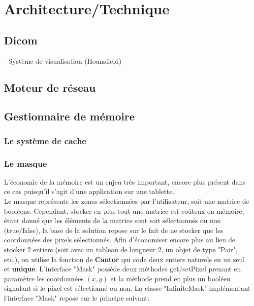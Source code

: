 \chapter{Architecture/Technique}


\section{Dicom}

- Système de visualisation (Hounsfield)

\section{Moteur de réseau}

\section{Gestionnaire de mémoire}
\subsection{Le système de cache}

\subsection{Le masque}
L'économie de la mémoire est un enjeu très important, encore plus présent dans ce cas
puisqu'il s'agit d'une application sur une tablette.\\
Le masque représente les zones sélectionnées
par l'utilisateur, soit une matrice de booléens. Cependant, stocker en plus tout une matrice est coûteux en mémoire,
étant donné que les éléments de la matrice sont soit sélectionnés ou non \\
(true/false), la base de la solution repose sur le fait de ne stocker que les
\\coordonnées des pixels sélectionnés. Afin d'économiser encore plus au lieu de stocker 2 entiers (soit avec un tableau de longueur 2,
un objet de type "Pair", etc.), on utilise la fonction de \textbf{Cantor} qui code deux entiers naturels en un seul et \textbf{unique}.
L'interface "Mask" possède deux méthodes get/setPixel prenant en paramètre les coordonnées $(x,y)$ et la méthode prend en plus un booléen\\
signalant si le pixel est sélectionné ou non.
La classe "InfiniteMask" implémentant l'interface "Mask" repose sur le principe suivant:
\vspace{0.2cm}

